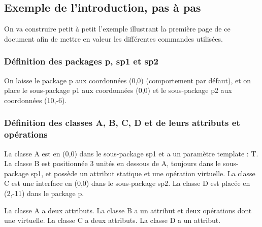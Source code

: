 \documentclass[a4paper,11pt]{report}
\newcommand{\inputTikZ}[1]{%
  }%
\newcommand{\inputTikZ}[1]{%
    \texttt{[image: fig/\#1.pdf]}%
  }%
\begin{document}
\subsection{Exemple de l'introduction, pas à pas}

On va construire petit à petit l'exemple illustrant la première page de ce document afin de mettre en valeur les différentes commandes utilisées.

\subsubsection{Définition des packages p, sp1 et sp2}

On laisse le package p aux coordonnées (0,0) (comportement par défaut), et on place le sous-package p1 aux coordonnées (0,0) et le sous-package p2 aux coordonnées (10,-6).

{\color{red!70!black}
\vspace{-0.4cm}
\vspace{-0.4cm}
\vspace{-0.4cm}

}

\begin{center}
\inputTikZ{figure31}
\end{center}

\subsubsection{Définition des classes A, B, C, D et de leurs attributs et opérations}

La classe A est en (0,0) dans le sous-package sp1 et a un paramètre template : T. La classe B est positionnée 3 unités en dessous de A, toujours dans le sous-package sp1, et  possède un attribut statique et une opération virtuelle. La classe C est une interface en (0,0) dans le sous-package sp2. La classe D est placée en (2,-11) dans le package p.

La classe A a deux attributs. La classe B a un attribut et deux opérations dont une virtuelle. La classe C a deux attributs. La classe D a un attribut.

\vspace{-0.4cm}
{\color{red!70!black}
\vspace{-0.4cm}
}
\vspace{-0.4cm}
{\color{red!70!black}
\vspace{-0.4cm}
}
\vspace{-0.4cm}
{\color{red!70!black}
\vspace{-0.4cm}
}

\end{document}
